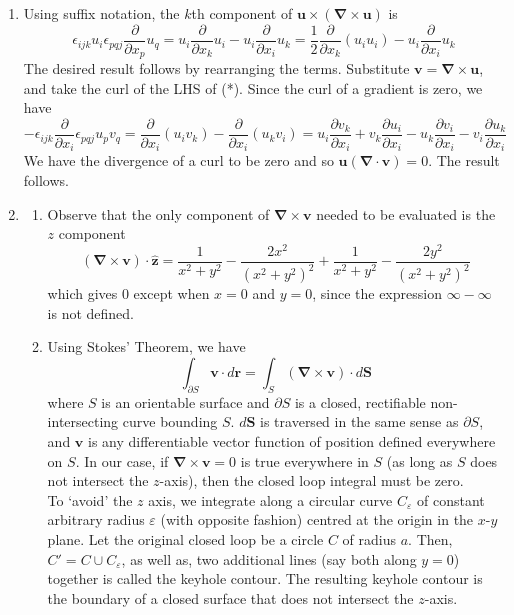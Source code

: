 \documentclass[a4paper]{article}
\begin{document}
\begin{ans}\leavevmode
\begin{enumerate}[label=(\alph*)]
    \item Using suffix notation, the $k$th component of $\mathbf{u}\times(\boldsymbol{\nabla}\times\mathbf{u})$ is
    \begin{equation}
\epsilon_{ijk}u_i\epsilon_{pqj}\frac{\partial}{\partial x_p}u_q=u_i\frac{\partial}{\partial x_k}u_i-u_i\frac{\partial}{\partial x_i}u_k=\frac{1}{2}\frac{\partial}{\partial x_k}(u_iu_i)-u_i\frac{\partial}{\partial x_i}u_k\tag{*}
\end{equation}
The desired result follows by rearranging the terms. Substitute $\mathbf{v}=\boldsymbol{\nabla}\times\mathbf{u}$, and take the curl of the LHS of (*). Since the curl of a gradient is zero, we have
$$-\epsilon_{ijk}\frac{\partial}{\partial x_i}\epsilon_{pqj}u_pv_q=\frac{\partial}{\partial x_i}(u_iv_k)-\frac{\partial}{\partial x_i}(u_kv_i)=u_i\frac{\partial v_k}{\partial x_i}+v_k\frac{\partial u_i}{\partial x_i}-u_k\frac{\partial v_i}{\partial x_i}-v_i\frac{\partial u_k}{\partial x_i}$$
We have the divergence of a curl to be zero and so $\mathbf{u}(\boldsymbol{\nabla}\cdot\mathbf{v})=0$. The result follows.
\item \begin{enumerate}[label=(\roman*)]
    \item  Observe that the only component of $\boldsymbol{\nabla}\times\mathbf{v}$ needed to be evaluated is the $z$ component 
$$(\boldsymbol{\nabla}\times\mathbf{v})\cdot\mathbf{\hat{z}}=\frac{1}{x^2+y^2}-\frac{2x^2}{(x^2+y^2)^2}+\frac{1}{x^2+y^2}-\frac{2y^2}{(x^2+y^2)^2}$$
which gives 0 except when $x=0$ and $y=0$, since the expression $\infty-\infty$ is not defined.
\item Using Stokes' Theorem, we have
$$\int_{\partial S}\mathbf{v}\cdot d\mathbf{r}=\int_S(\boldsymbol{\nabla}\times\mathbf{v})\cdot d\mathbf{S}$$
where $S$ is an orientable surface and $\partial S$ is a closed, rectifiable non-intersecting curve bounding $S$. $d\mathbf{S}$ is traversed in the same sense as $\partial S$, and $\mathbf{v}$ is any differentiable vector function of position defined everywhere on $S$. In our case, if $\boldsymbol{\nabla}\times\mathbf{v}=0$ is true everywhere in $S$ (as long as $S$ does not intersect the $z$-axis), then the closed loop integral must be zero.\\[5pt]
To `avoid' the $z$ axis, we integrate along a circular curve $C_\varepsilon$ of constant arbitrary radius $\varepsilon$ (with opposite fashion) centred at the origin in the $x$-$y$ plane. Let the original closed loop be a circle $C$ of radius $a$. Then, $C'=C\cup C_\varepsilon$, as well as, two additional lines (say both along $y=0$) together is called the keyhole contour. The resulting keyhole contour is the boundary of a closed surface that does not intersect the $z$-axis.
   \begin{center}
\end{center}
\end{enumerate}
\end{enumerate}
\end{ans}
\end{document}
